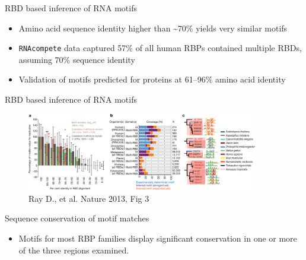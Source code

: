 \documentclass[professionalfont, 12pt, default]{beamer}
\providecommand{\tightlist}{%
    \setlength{\itemsep}{0pt}\setlength{\parskip}{0pt}}
\begin{document}
\begin{frame}[fragile]{RBD based inference of RNA motifs}

\begin{itemize}
\tightlist
\item
  Amino acid sequence identity higher than \textasciitilde{}70\% yields
  very similar motifs
\item
  \texttt{RNAcompete} data captured 57\% of all human RBPs contained
  multiple RBDs, assuming 70\% sequence identity
\item
  Validation of motifs predicted for proteins at 61--96\% amino acid
  identity
\end{itemize}

\end{frame}

\begin{frame}{RBD based inference of RNA motifs}

\begin{figure}
\centering
\includegraphics[width=0.90000\textwidth]{img/f3.jpg}
\caption{Ray D., et al. Nature 2013, Fig 3}
\end{figure}

\end{frame}

\begin{frame}{Sequence conservation of motif matches}

\begin{itemize}
\tightlist
\item
  Motifs for most RBP families display significant conservation in one
  or more of the three regions examined.
\end{itemize}

\end{frame}
\end{document}
